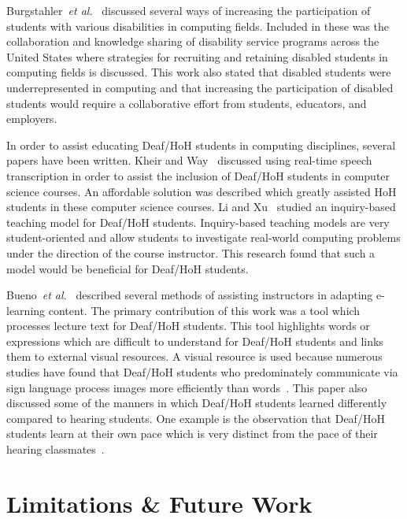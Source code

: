 \documentclass[conference]{IEEEtran}
\newcommand{\todo}[1]{\textcolor{cyan}{\textbf{[#1]}}}
\begin{document}
Burgstahler~\emph{et al.}~\cite{4418169} discussed several ways of increasing the participation of students with various disabilities in computing fields. Included in these was the collaboration and knowledge sharing of disability service programs across the United States where strategies for recruiting and retaining disabled students in computing fields is discussed. This work also stated that disabled students were underrepresented in computing and that increasing the participation of disabled students would require a collaborative effort from students, educators, and employers.

In order to assist educating Deaf/HoH students in computing disciplines, several papers have been written. Kheir and Way~\cite{Kheir:2007:IDS:1269900.1268860} discussed using real-time speech transcription in order to assist the inclusion of Deaf/HoH students in computer science courses. An affordable solution was described which greatly assisted HoH students in these computer science courses. Li and Xu~\cite{5454732} studied an inquiry-based teaching model for Deaf/HoH students. Inquiry-based teaching models are very student-oriented and allow students to investigate real-world computing problems under the direction of the course instructor. This research found that such a model would be beneficial for Deaf/HoH students.

Bueno~\emph{et al.}~\cite{Bueno:2007:ALA:1268784.1268903} described several methods of assisting instructors in adapting e-learning content. The primary contribution of this work was a tool which processes lecture text for Deaf/HoH students. This tool highlights words or expressions which are difficult to understand for Deaf/HoH students and links them to external visual resources. A visual resource is used because numerous studies have found that Deaf/HoH students who predominately communicate via sign language process images more efficiently than words~\cite{Santos}. This paper also discussed some of the manners in which Deaf/HoH students learned differently compared to hearing students. One example is the observation that Deaf/HoH students learn at their own pace which is very distinct from the pace of their hearing classmates~\cite{Bueno:2007:ECA:1268784.1268862}.

\section{Limitations \& Future Work}
\label{sec: futurework}

\end{document}
